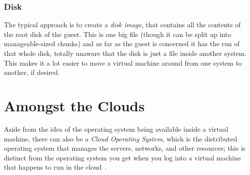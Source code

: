 \subsubsection*{Disk}

The typical approach is to create a \textit{disk image}, that contains all the contents of the root disk of the guest. This is one big file (though it can be split up into manageable-sized chunks) and as far as the guest is concerned it has the run of that whole disk, totally unaware that the disk is just a file inside another system. This makes it a lot easier to move a virtual machine around from one system to another, if desired.

\section*{Amongst the Clouds}
Aside from the idea of the operating system being available inside a virtual machine, there can also be a \textit{Cloud Operating System}, which is the distributed operating system that manages the servers, networks, and other resources; this is distinct from the operating system you get when you log into a virtual machine that happens to run in the cloud~\cite{osi}.



